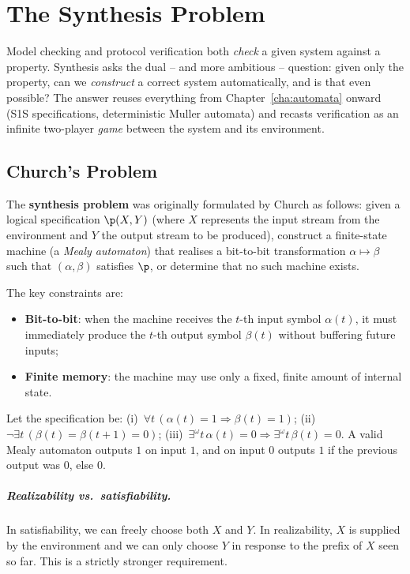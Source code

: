 \documentclass[oneside]{academica}
\begin{document}
\chapter{The Synthesis Problem}

Model checking and protocol verification both \emph{check} a given system against a property. Synthesis asks the dual -- and more ambitious -- question: given only the property, can we \emph{construct} a correct system automatically, and is that even possible? The answer reuses everything from Chapter~\ref{cha:automata} onward (S1S specifications, deterministic Muller automata) and recasts verification as an infinite two-player \emph{game} between the system and its environment.

\section{Church's Problem}

The \textbf{synthesis problem} was originally formulated by Church as follows: given a logical specification $\p(X, Y)$ (where $X$ represents the input stream from the environment and $Y$ the output stream to be produced), construct a finite-state machine (a \emph{Mealy automaton}) that realises a bit-to-bit transformation $\alpha \mapsto \beta$ such that $(\alpha, \beta)$ satisfies $\p$, or determine that no such machine exists.

The key constraints are:
\begin{itemize}
  \item \textbf{Bit-to-bit}: when the machine receives the $t$-th input symbol $\alpha(t)$, it must immediately produce the $t$-th output symbol $\beta(t)$ without buffering future inputs;
  \item \textbf{Finite memory}: the machine may use only a fixed, finite amount of internal state.
\end{itemize}

\begin{example*}
  Let the specification be: (i)~$\forall t\,(\alpha(t) = 1 \Rightarrow \beta(t) = 1)$; (ii)~$\neg\exists t\,(\beta(t) = \beta(t+1) = 0)$; (iii)~$\exists^\omega t\,\alpha(t) = 0 \Rightarrow \exists^\omega t\,\beta(t) = 0$.
  A valid Mealy automaton outputs $1$ on input $1$, and on input $0$ outputs $1$ if the previous output was $0$, else $0$.
\end{example*}

\paragraph{Realizability vs.\ satisfiability.}
In satisfiability, we can freely choose both $X$ and $Y$. In realizability, $X$ is supplied by the environment and we can only choose $Y$ in response to the prefix of $X$ seen so far. This is a strictly stronger requirement.
\end{document}
